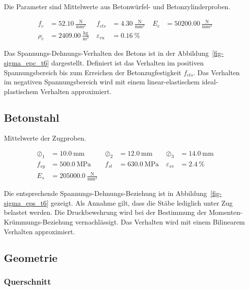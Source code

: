 \documentclass[
  11pt,
  letterpaper,
]{scrreprt}
\begin{document}
Die Parameter sind Mittelwerte aus Betonwürfel- und Betonzylinderproben.

$$
\begin{aligned}
f_{c} &= 52.10\ \frac{\mathrm{N}}{\mathrm{mm}^{2}} \; 
 &f_{cts} &= 4.30\ \frac{\mathrm{N}}{\mathrm{mm}^{2}} \; 
 &E_{c} &= 50200.00\ \frac{\mathrm{N}}{\mathrm{mm}^{2}} \; 
\\[10pt]
 \rho_{c} &= 2409.00\ \frac{\mathrm{kg}}{\mathrm{m}^{3}} \; 
 &\varepsilon_{cu} &= 0.16\ \mathrm{\%} \;
\end{aligned}
$$

Das Spannungs-Dehnungs-Verhalten des Betons ist in der
Abbildung~\ref{fig-sigma_epc_t6} dargestellt. Definiert ist das
Verhalten im positiven Spannungsbereich bis zum Erreichen der
Betonzugfestigkeit \(f_{cts}\). Das Verhalten im negativen
Spannungsbereich wird mit einem linear-elastischem ideal-plastischem
Verhalten approximiert.

\subsection{Betonstahl}\label{betonstahl}

Mittelwerte der Zugproben.

$$
\begin{aligned}
\oslash_{1} &= 10.0\ \mathrm{mm} \; 
 &\oslash_{2} &= 12.0\ \mathrm{mm} \; 
 &\oslash_{3} &= 14.0\ \mathrm{mm} \; 
\\[10pt]
 f_{sy} &= 500.0\ \mathrm{MPa} \; 
 &f_{st} &= 630.0\ \mathrm{MPa} \; 
 &\varepsilon_{sv} &= 2.4\ \mathrm{\%} \; 
\\[10pt]
 E_{s} &= 205000.0\ \frac{\mathrm{N}}{\mathrm{mm}^{2}} \;
\end{aligned}
$$

Die entsprechende Spannungs-Dehnungs-Beziehung ist in
Abbildung~\ref{fig-sigma_eps_t6} gezeigt. Als Annahme gilt, dass die
Stäbe lediglich unter Zug belastet werden. Die Druckbewehrung wird bei
der Bestimmung der Momenten-Krümmungs-Beziehung vernachlässigt. Das
Verhalten wird mit einem Bilinearem Verhalten approximiert.

\subsection{Geometrie}\label{geometrie}

\subsubsection{Querschnitt}\label{querschnitt}
\end{document}
